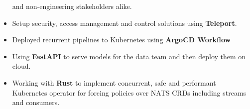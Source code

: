 \begin{itemize}
            and non-engineering stakeholders alike.
      \item Setup security, access management and control solutions using \textbf{Teleport}.
      \item Deployed recurrent pipelines to Kubernetes using \textbf{ArgoCD Workflow}
      \item Using \textbf{FastAPI} to serve models for the data team and then deploy them on cloud.
      \item Working with \textbf{Rust} to implement concurrent, safe and performant Kubernetes operator for forcing
            policies over NATS CRDs including streams and consumers.
\end{itemize}

\vspace{0.5cm}

